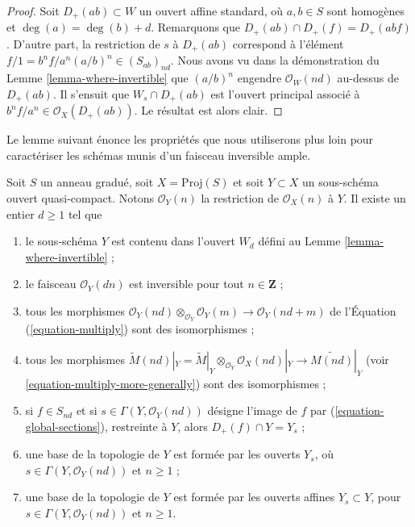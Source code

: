 \begin{proof}
Soit $D_{+}(ab) \subset W$ un ouvert affine standard, où $a, b \in S$ sont
homogènes et $\deg(a) = \deg(b) + d$. Remarquons que
$D_{+}(ab) \cap D_{+}(f) = D_{+}(abf)$. D'autre part, la restriction de $s$
à $D_{+}(ab)$ correspond à l'élément
$f/1 = b^nf/a^n (a/b)^n \in (S_{ab})_{nd}$.
Nous avons vu dans la démonstration du
Lemme \ref{lemma-where-invertible} que
$(a/b)^n$ engendre $\mathcal{O}_W(nd)$ au-dessus de $D_{+}(ab)$.
Il s'ensuit que $W_s \cap D_{+}(ab)$ est l'ouvert principal associé à
$b^nf/a^n \in \mathcal{O}_X(D_{+}(ab))$. Le résultat est alors clair.
\end{proof}

\noindent
Le lemme suivant énonce les propriétés que nous utiliserons plus loin pour
caractériser les schémas munis d'un faisceau inversible ample.

\begin{lemma}
\label{lemma-ample-on-proj}
Soit $S$ un anneau gradué, soit $X = \text{Proj}(S)$ et soit
$Y \subset X$ un sous-schéma ouvert quasi-compact. Notons
$\mathcal{O}_Y(n)$ la restriction de $\mathcal{O}_X(n)$ à $Y$.
Il existe un entier $d \geq 1$ tel que
\begin{enumerate}
\item le sous-schéma $Y$ est contenu dans l'ouvert $W_d$ défini au
Lemme \ref{lemma-where-invertible} ;
\item le faisceau $\mathcal{O}_Y(dn)$ est inversible pour tout
$n \in \mathbf{Z}$ ;
\item tous les morphismes
$\mathcal{O}_Y(nd) \otimes_{\mathcal{O}_Y} \mathcal{O}_Y(m)
\longrightarrow
\mathcal{O}_Y(nd + m)$
de l'Équation (\ref{equation-multiply}) sont des isomorphismes ;
\item tous les morphismes
$\widetilde M(nd)|_Y = \widetilde M|_Y \otimes_{\mathcal{O}_Y}
\mathcal{O}_X(nd)|_Y \to \widetilde{M(nd)}|_Y$
(voir \ref{equation-multiply-more-generally}) sont des isomorphismes ;
\item si $f \in S_{nd}$ et si
$s \in \Gamma(Y, \mathcal{O}_Y(nd))$ désigne
l'image de $f$ par (\ref{equation-global-sections}),
restreinte à $Y$, alors
$D_{+}(f) \cap Y = Y_s$ ;
\item une base de la topologie de $Y$ est formée par les ouverts $Y_s$,
où $s \in \Gamma(Y, \mathcal{O}_Y(nd))$ et $n \geq 1$ ;
\item une base de la topologie de $Y$ est formée par les ouverts affines
$Y_s \subset Y$, pour
$s \in \Gamma(Y, \mathcal{O}_Y(nd))$ et $n \geq 1$.
\end{enumerate}
\end{lemma}


